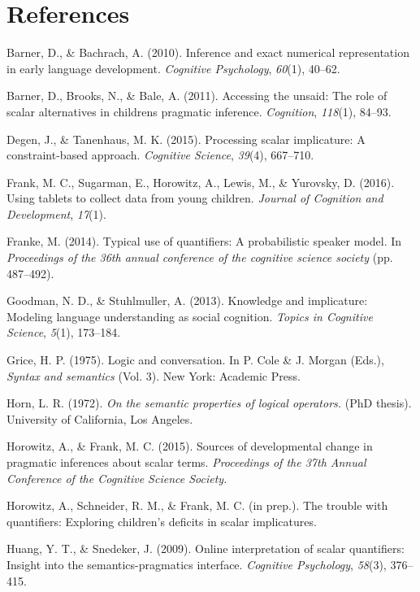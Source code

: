 \documentclass[10pt, letterpaper]{article}
\begin{document}
\section{References}\label{references}

\setlength{\parindent}{-0.1in} \setlength{\leftskip}{0.125in} \noindent

Barner, D., \& Bachrach, A. (2010). Inference and exact numerical
representation in early language development. \emph{Cognitive
Psychology}, \emph{60}(1), 40--62.

Barner, D., Brooks, N., \& Bale, A. (2011). Accessing the unsaid: The
role of scalar alternatives in childrens pragmatic inference.
\emph{Cognition}, \emph{118}(1), 84--93.

Degen, J., \& Tanenhaus, M. K. (2015). Processing scalar implicature: A
constraint-based approach. \emph{Cognitive Science}, \emph{39}(4),
667--710.

Frank, M. C., Sugarman, E., Horowitz, A., Lewis, M., \& Yurovsky, D.
(2016). Using tablets to collect data from young children. \emph{Journal
of Cognition and Development}, \emph{17}(1).

Franke, M. (2014). Typical use of quantifiers: A probabilistic speaker
model. In \emph{Proceedings of the 36th annual conference of the
cognitive science society} (pp. 487--492).

Goodman, N. D., \& Stuhlmuller, A. (2013). Knowledge and implicature:
Modeling language understanding as social cognition. \emph{Topics in
Cognitive Science}, \emph{5}(1), 173--184.

Grice, H. P. (1975). Logic and conversation. In P. Cole \& J. Morgan
(Eds.), \emph{Syntax and semantics} (Vol. 3). New York: Academic Press.

Horn, L. R. (1972). \emph{On the semantic properties of logical
operators.} (PhD thesis). University of California, Los Angeles.

Horowitz, A., \& Frank, M. C. (2015). Sources of developmental change in
pragmatic inferences about scalar terms. \emph{Proceedings of the 37th
Annual Conference of the Cognitive Science Society.}

Horowitz, A., Schneider, R. M., \& Frank, M. C. (in prep.). The trouble
with quantifiers: Exploring children's deficits in scalar implicatures.

Huang, Y. T., \& Snedeker, J. (2009). Online interpretation of scalar
quantifiers: Insight into the semantics-pragmatics interface.
\emph{Cognitive Psychology}, \emph{58}(3), 376--415.
\end{document}
